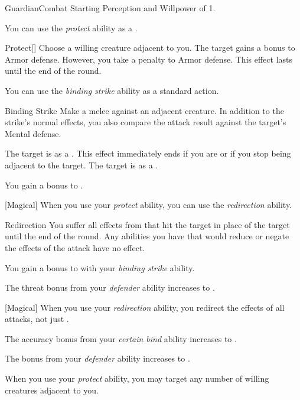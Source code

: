     \begin{feat}{Guardian}{Combat}
        \featpre Starting Perception and Willpower of 1.

         You can use the \textit{protect} ability as a .
        \begin{freeability}{Protect}[]
            Choose a willing creature adjacent to you.
            The target gains a  bonus to Armor defense.
            However, you take a  penalty to Armor defense.
            This effect lasts until the end of the round.
        \end{freeability}

         You can use the \textit{binding strike} ability as a standard action.
        \begin{apability}{Binding Strike}
            Make a melee  against an adjacent creature.
            In addition to the strike's normal effects, you also compare the attack result against the target's Mental defense.

            \hit The target is  as a .
            This effect immediately ends if you are  or if you stop being adjacent to the target.
            \crit The target is  as a .
        \end{apability}

         You gain a  bonus to .

        [Magical] When you use your \textit{protect} ability, you can use the \textit{redirection} ability.
        \begin{apability}{Redirection}
            You suffer all effects from  that hit the target in place of the target until the end of the round.
            Any abilities you have that would reduce or negate the effects of the attack have no effect.
        \end{apability}

         You gain a  bonus to  with your \textit{binding strike} ability.

         The threat bonus from your \textit{defender} ability increases to .

        [Magical] When you use your \textit{redirection} ability, you redirect the effects of all attacks, not just .

         The accuracy bonus from your \textit{certain bind} ability increases to .

         The bonus from your \textit{defender} ability increases to .

         When you use your \textit{protect} ability, you may target any number of willing creatures adjacent to you.
    \end{feat}

